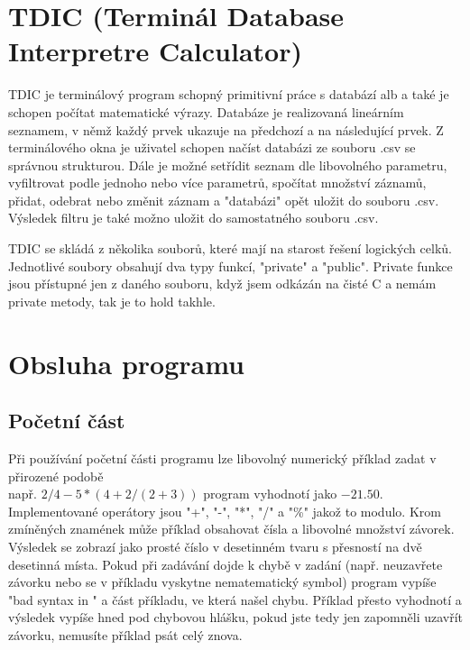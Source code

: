 \documentclass{article}
\begin{document}
\section{TDIC (Terminál Database Interpretre Calculator)}
TDIC je terminálový program schopný primitivní práce s databází alb a také je schopen počítat matematické výrazy.
Databáze je realizovaná lineárním seznamem, v němž každý prvek ukazuje na předchozí a na následující prvek.
Z terminálového okna je uživatel schopen načíst databázi ze souboru .csv se správnou strukturou.
Dále je možné setřídit seznam dle libovolného parametru, vyfiltrovat podle jednoho nebo více parametrů, spočítat množství záznamů, přidat, odebrat nebo změnit záznam a "databázi" opět uložit do souboru .csv.
Výsledek filtru je také možno uložit do samostatného souboru .csv.

TDIC se skládá z několika souborů, které mají na starost řešení logických celků.
Jednotlivé soubory obsahují dva typy funkcí, "private" a "public".
Private funkce jsou přístupné jen z daného souboru, když jsem odkázán na čisté C a nemám private metody, tak je to hold takhle.

\section{Obsluha programu}
\subsection{Početní část}
Při používání početní části programu lze libovolný numerický příklad zadat v přirozené podobě \\např. \(2/4-5*(4+2/(2+3))\) program vyhodnotí jako \(-21.50\).
Implementované operátory jsou "+", "-", "*", "/" a "\%" jakož to modulo.
Krom zmíněných znamének může příklad obsahovat čísla a libovolné množství závorek.
Výsledek se zobrazí jako prosté číslo v desetinném tvaru s přesností na dvě desetinná místa.
Pokud při zadávání dojde k chybě v zadání (např. neuzavřete závorku nebo se v příkladu vyskytne nematematický symbol) program vypíše "bad syntax in " a část příkladu, ve která našel chybu.
Příklad přesto  vyhodnotí a výsledek vypíše hned pod chybovou hlášku, pokud jste tedy jen zapomněli uzavřít závorku, nemusíte příklad psát celý znova.
\end{document}
